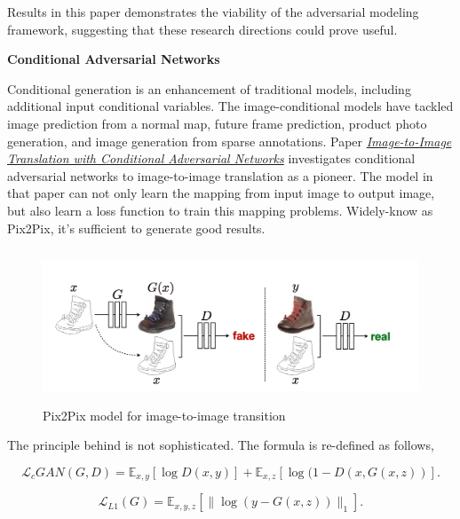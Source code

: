 \documentclass[a4paper]{article}
\begin{document}
Results in this paper demonstrates the viability of the adversarial modeling framework, suggesting that these research directions could prove useful.

\vspace{2mm}
\begin{center}
\large\textbf{Conditional Adversarial Networks}
\end{center}
\vspace{1mm}
\large{

Conditional generation is an enhancement of traditional models, including additional input conditional variables. The image-conditional models have tackled image prediction from a normal map, future frame prediction, product photo generation, and image generation from sparse annotations. Paper \href{https://arxiv.org/pdf/1611.07004.pdf}{\emph{Image-to-Image Translation with Conditional Adversarial Networks}} investigates conditional adversarial networks to image-to-image translation as a pioneer. The model in that paper can not only learn the mapping from input image to output image, but also learn a loss function to train this mapping problems. Widely-know as \textsf{Pix2Pix}, it's sufficient to generate good results.

\vspace{2mm}
\begin{figure}[H]
\centering
\includegraphics[width=12.5cm,height=4.58cm]{pix2pix.png}
\caption{\textsf{Pix2Pix} model for image-to-image transition}
\end{figure}
\vspace{2mm}

The principle behind is not sophisticated. The formula is re-defined as follows, 

\begin{equation}
\mathcal{L}_c GAN(G,D)=\mathbb{E}_{x,y} [\log D(x,y)] + \mathbb{E}_{x,z} [\log {(1-D(x,G(x,z))}].
\end{equation}

\begin{equation}
\mathcal{L}_{L1}(G)=\mathbb{E}_{x,y,z} [\|\log {(y-G(x,z))}\|_1].
\end{equation}

}
\end{document}
